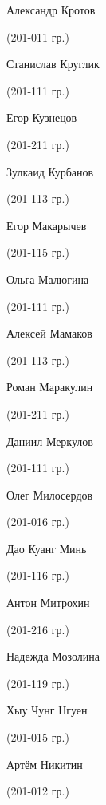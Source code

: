 \begin{multicols}{2}
\begin{small}
\begin{enumerate*}
	\item Александр Кротов\begin{tiny} (201-011 гр.)\end{tiny}
	\item Станислав Круглик\begin{tiny} (201-111 гр.)\end{tiny}
	\item Егор Кузнецов\begin{tiny} (201-211 гр.)\end{tiny}
	\item Зулкаид Курбанов\begin{tiny} (201-113 гр.)\end{tiny}
	\item Егор Макарычев\begin{tiny} (201-115 гр.)\end{tiny}
	\item Ольга Малюгина\begin{tiny} (201-111 гр.)\end{tiny}
	\item Алексей Мамаков\begin{tiny} (201-113 гр.)\end{tiny}
	\item Роман Маракулин\begin{tiny} (201-211 гр.)\end{tiny}
	\item Даниил Меркулов\begin{tiny} (201-111 гр.)\end{tiny}
	\item Олег Милосердов\begin{tiny} (201-016 гр.)\end{tiny}
	\item Дао Куанг Минь\begin{tiny} (201-116 гр.)\end{tiny}
	\item Антон Митрохин\begin{tiny} (201-216 гр.)\end{tiny}
	\item Надежда Мозолина\begin{tiny} (201-119 гр.)\end{tiny}
	\item Хыу Чунг Нгуен\begin{tiny} (201-015 гр.)\end{tiny}
	\item Артём Никитин\begin{tiny} (201-012 гр.)\end{tiny}

\end{enumerate*}
\end{small}
\end{multicols}
